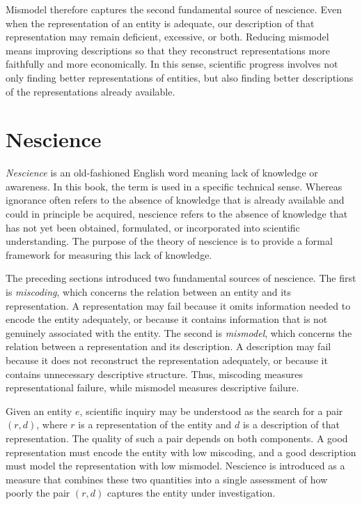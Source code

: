 Mismodel therefore captures the second fundamental source of nescience. Even when the representation of an entity is adequate, our description of that representation may remain deficient, excessive, or both. Reducing mismodel means improving descriptions so that they reconstruct representations more faithfully and more economically. In this sense, scientific progress involves not only finding better representations of entities, but also finding better descriptions of the representations already available.

%
%

\section{Nescience}
\label{sec:ch1_nescience}

\emph{Nescience} is an old-fashioned English word meaning lack of knowledge or awareness. In this book, the term is used in a specific technical sense. Whereas ignorance often refers to the absence of knowledge that is already available and could in principle be acquired, nescience refers to the absence of knowledge that has not yet been obtained, formulated, or incorporated into scientific understanding. The purpose of the theory of nescience is to provide a formal framework for measuring this lack of knowledge.

The preceding sections introduced two fundamental sources of nescience. The first is \emph{miscoding}, which concerns the relation between an entity and its representation. A representation may fail because it omits information needed to encode the entity adequately, or because it contains information that is not genuinely associated with the entity. The second is \emph{mismodel}, which concerns the relation between a representation and its description. A description may fail because it does not reconstruct the representation adequately, or because it contains unnecessary descriptive structure. Thus, miscoding measures representational failure, while mismodel measures descriptive failure.

Given an entity $e$, scientific inquiry may be understood as the search for a pair $(r,d)$, where $r$ is a representation of the entity and $d$ is a description of that representation. The quality of such a pair depends on both components. A good representation must encode the entity with low miscoding, and a good description must model the representation with low mismodel. Nescience is introduced as a measure that combines these two quantities into a single assessment of how poorly the pair $(r,d)$ captures the entity under investigation.


